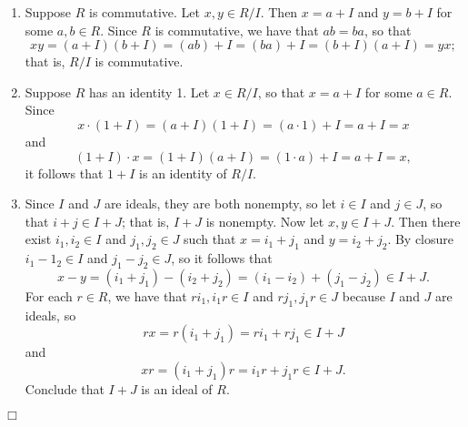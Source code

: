 \documentclass[9pt]{article}
\newcommand{\qed}{\hfill \ensuremath{\Box}}
\begin{document}
\begin{enumerate}
      \begin{enumerate}
         \item Suppose $R$ is commutative. Let $x, y \in R/I$. Then
               $x = a + I$ and $y = b + I$ for some $a, b \in R$. Since $R$ is
               commutative, we have that $ab = ba$, so that
               $$xy = (a + I)(b + I) = (ab) + I = (ba) + I =
                 (b + I)(a + I) = yx;$$
               that is, $R/I$ is commutative.
         \item Suppose $R$ has an identity 1. Let $x \in R/I$, so that
               $x = a + I$ for some $a \in R$. Since
               $$x \cdot (1 + I) = (a + I)(1 + I) = (a\cdot 1) + I = a + I =x$$
               and
               $$(1 + I) \cdot x = (1 + I)(a + I) = (1\cdot a) + I = a + I =x,$$
               it follows that $1 + I$ is an identity of $R/I$.
         \item Since $I$ and $J$ are ideals, they are both nonempty, so let
               $i \in I$ and $j \in J$, so that $i + j \in I + J$; that is,
               $I + J$ is nonempty. Now let $x, y \in I + J$. Then there exist
               $i_1, i_2 \in I$ and $j_1, j_2 \in J$ such that $x = i_1 + j_1$
               and $y = i_2 + j_2$. By closure $i_1 - 1_2 \in I$ and
               $j_1 - j_2 \in J$, so it follows that
               $$x - y = (i_1 + j_1) - (i_2 + j_2) =
                 (i_1 - i_2) + (j_1 - j_2) \in I + J.$$
               For each $r \in R$, we have that $ri_1, i_1r \in I$ and
               $rj_1, j_1r \in J$ because $I$ and $J$ are ideals, so
               $$rx = r(i_1 + j_1) = ri_1 + rj_1 \in I + J$$
               and
               $$xr = (i_1 + j_1)r = i_1r + j_1r \in I + J.$$
               Conclude that $I + J$ is an ideal of $R$.
      \end{enumerate} \qed
\end{enumerate}
\end{document}

